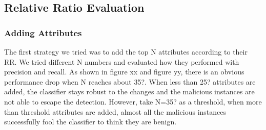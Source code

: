 \documentclass[11pt]{article}
\begin{document}
\subsection{Relative Ratio Evaluation}
\subsubsection{Adding Attributes}
The first strategy we tried was to add the top N attributes according to their RR. We tried different N numbers and evaluated how they performed with precision and recall. As shown in figure xx and figure yy, there is an obvious performance drop when N reaches about 35?. When less than 25? attributes are added, the classifier stays robust to the changes and the malicious instances are not able to escape the detection. However, take N=35? as a threshold, when more than threshold attributes are added, almost all the malicious instances successfully fool the classifier to think they are benign.
\end{document}
